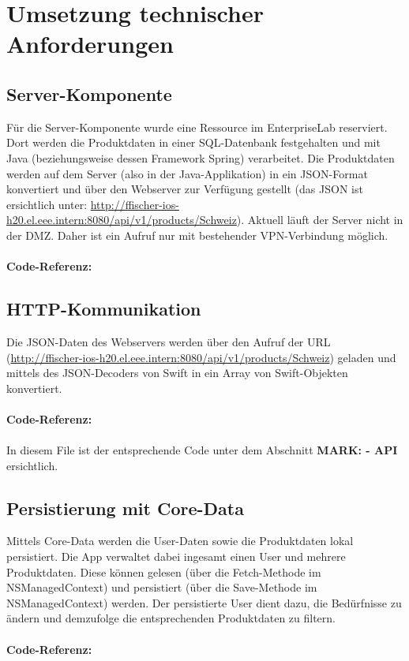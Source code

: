 \documentclass[12pt,titlepage]{article}
\begin{document}
\section{Umsetzung technischer Anforderungen}
\subsection{Server-Komponente}
Für die Server-Komponente wurde eine Ressource im EnterpriseLab reserviert. Dort werden die Produktdaten in einer SQL-Datenbank festgehalten und mit Java (beziehungsweise dessen Framework Spring) verarbeitet. Die Produktdaten werden auf dem Server (also in der Java-Applikation) in ein JSON-Format konvertiert und über den Webserver zur Verfügung gestellt (das JSON ist ersichtlich unter: \url{http://ffischer-ios-h20.el.eee.intern:8080/api/v1/products/Schweiz}). Aktuell läuft der Server nicht in der DMZ. Daher ist ein Aufruf nur mit bestehender VPN-Verbindung möglich.\\
\\
\textbf{Code-Referenz: }

\subsection{HTTP-Kommunikation}
Die JSON-Daten des Webservers werden über den Aufruf der  URL (\url{http://ffischer-ios-h20.el.eee.intern:8080/api/v1/products/Schweiz}) geladen und mittels des JSON-Decoders von Swift in ein Array von Swift-Objekten konvertiert.\\
\\
\textbf{Code-Referenz: }\\  \\ In diesem File ist der entsprechende Code unter dem Abschnitt \textbf{\glqq MARK: - API\grqq\,} ersichtlich.

\subsection{Persistierung mit Core-Data}
Mittels Core-Data werden die User-Daten sowie die Produktdaten lokal persistiert. Die App verwaltet dabei ingesamt einen User und mehrere Produktdaten. Diese können gelesen (über die Fetch-Methode im NSManagedContext) und persistiert (über die Save-Methode im NSManagedContext) werden. Der persistierte User dient dazu, die Bedürfnisse zu ändern und demzufolge die entsprechenden Produktdaten zu filtern.\\
\\
\textbf{Code-Referenz: }\\ 
\end{document}
